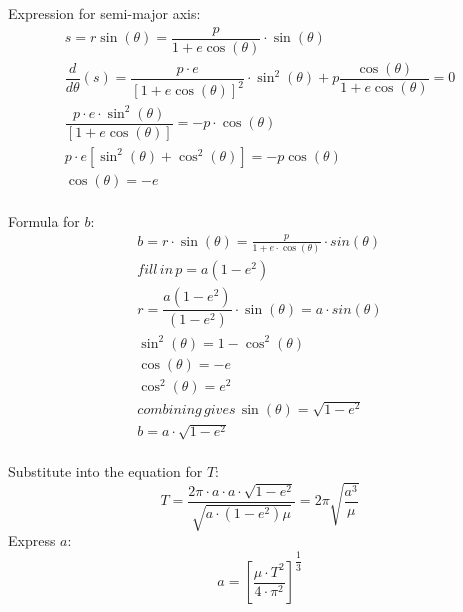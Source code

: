 Expression for semi-major axis:
\begin{equation}
\begin{split}
    s=r\sin \left( \theta \right) =\dfrac {p}{1+e\cos \left( \theta \right) }\cdot \sin \left( \theta \right) \\
    \dfrac {d}{d\theta }\left( s\right) =\dfrac {p\cdot e}{\left[ 1+e\cos \left( \theta \right) \right] ^{2}}\cdot \sin ^{2}\left( \theta \right) +p\dfrac {\cos \left( \theta \right) }{1+e\cos \left( \theta \right) } = 0\\
    \dfrac {p\cdot e\cdot \sin ^{2}\left( \theta \right) }{\left[ 1+e\cos \left( \theta \right) \right] }=-p\cdot \cos \left( \theta \right) \\
    p\cdot e\left[ \sin ^{2}\left( \theta \right) +\cos ^{2}\left( \theta \right) \right] =-p\cos \left( \theta \right) \\
    \cos(\theta) = -e\\
\end{split}
\end{equation}

Formula for $b$:
\begin{equation}
\begin{split}
    b = r \cdot \sin(\theta) = \frac{p}{1+e\cdot \cos(\theta)}\cdot sin(\theta)\\
    fill \, in\, p = a(1-e^2) \\
    r=\dfrac {a\left( 1-e^{2}\right) }{\left( 1-e^{2}\right) }\cdot \sin \left( \theta \right) =a\cdot sin\left( \theta \right) \\
    \sin ^{2}\left( \theta \right) =1-\cos ^{2}\left( \theta \right)\\
    \cos \left( \theta \right) =-e\\
    \cos ^{2}\left( \theta \right) =e^{2}\\
    combining \, gives \, \sin \left( \theta \right) =\sqrt {1-e^{2}} \\
    b=a\cdot \sqrt {1-e^{2}}\\
\end{split}
\end{equation}

Substitute into the equation for $T$:
\begin{equation}
    T=\dfrac {2\pi \cdot a\cdot a\cdot \sqrt {1-e^{2}}}{\sqrt {a\cdot \left( 1-e^{2}\right) \mu }}=2\pi \sqrt {\dfrac {a^{3}}{\mu }}
\end{equation}
Express $a$:
\begin{equation}
    a=\left[ \dfrac {\mu \cdot T^{2}}{4\cdot \pi ^{2}}\right] ^{\dfrac {1}{3}}
\end{equation}

